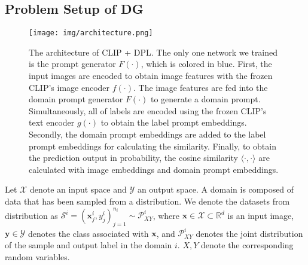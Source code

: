 \documentclass[letterpaper]{article} \usepackage[]{aaai23}
\newcommand{\dplshort}{DPL}
\begin{document}
\subsection{Problem Setup of DG}

\begin{figure}[h]
\begin{center}
\texttt{[image: img/architecture.png]}
\end{center}
  \caption{
  The architecture of CLIP + \dplshort.
  The only one network we trained is the prompt generator $F(\cdot)$, which is colored in blue.
  First, the input images are encoded to obtain image features with the frozen CLIP’s image encoder $f(\cdot)$.
  The image features are fed into the domain prompt generator $F(\cdot)$ to generate a domain prompt. 
  Simultaneously, all of labels are encoded using the frozen CLIP’s text encoder $g(\cdot)$ to obtain the label prompt embeddings.
  Secondly, the domain prompt embeddings are added to the label prompt embeddings for calculating the similarity.
  Finally, to obtain the prediction output in probability, the cosine similarity $\langle\cdot,\cdot \rangle$ are calculated with image embeddings and domain prompt embeddings.
 }
\label{fig:architecture}
\end{figure}



Let $\mathcal{X}$ denote an input space and $\mathcal{Y}$ an output space.
A domain is composed of data that has been sampled from a distribution.
We denote the datasets from distribution as 
$\mathcal{S}^{i} = {(\bm{x}_{j}^{i}, y_{j}^{i})}^{n_i}_{j=1} \sim \mathcal{P}_{XY}^{i}$,
where 
$\bm{x} \in \mathcal{X} \subset \mathbb{R}^{d}$ is an input image, 
$\bm{y} \in \mathcal{Y}$ denotes the class associated with $\bm{x}$, and 
$\mathcal{P}_{XY}^{i}$ 
denotes the joint distribution of the sample and output label in the domain $i$.
$X, Y$ denote the corresponding random variables.
\end{document}
